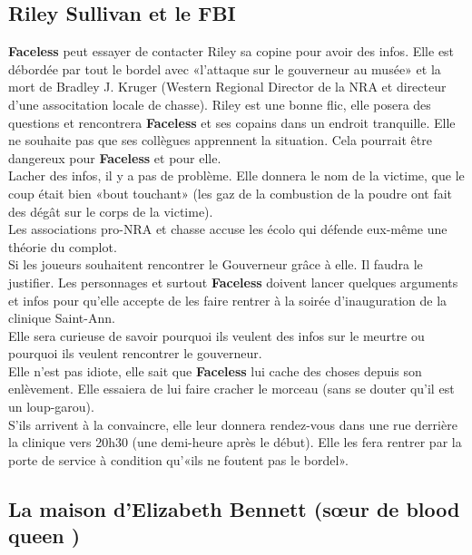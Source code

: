 \documentclass[oneside,12pt]{book}
\newcommand{\Laura}{\textbf{blood queen} }
\newcommand{\Andy}{\textbf{Faceless} }
\begin{document}
\begin{flushleft}
\subsection{Riley Sullivan et le FBI}
\Andy peut essayer de contacter Riley sa copine pour avoir des infos. Elle est débordée par tout le bordel avec «l’attaque sur le gouverneur au musée» et la mort de Bradley J. Kruger (Western Regional Director de la NRA et directeur d’une associtation locale de chasse). 
Riley est une bonne flic, elle posera des questions et rencontrera \Andy et ses copains dans un endroit tranquille. Elle ne souhaite pas que ses collègues apprennent la situation. Cela pourrait être dangereux pour \Andy et pour elle. \\
Lacher des infos, il y a pas de problème. Elle donnera le nom de la victime, que le coup était bien «bout touchant» (les gaz de la combustion de la poudre ont fait des dégât sur le corps de la victime).\\
Les associations pro-NRA et chasse accuse les écolo qui défende eux-même une théorie du complot.\\ 
Si les joueurs souhaitent rencontrer le Gouverneur grâce à elle. Il faudra le justifier. Les personnages et surtout \Andy doivent lancer quelques arguments et infos pour qu’elle accepte de les faire rentrer à la soirée d’inauguration de la clinique Saint-Ann. \\
Elle sera curieuse de savoir pourquoi ils veulent des infos sur le meurtre ou pourquoi ils veulent rencontrer le gouverneur. \\
Elle n’est pas idiote, elle sait que \Andy lui cache des choses depuis son enlèvement. Elle essaiera de lui faire cracher le morceau (sans se douter qu’il est un loup-garou).\\

S’ils arrivent à la convaincre, elle leur donnera rendez-vous dans une rue derrière la clinique vers 20h30 (une demi-heure après le début). Elle les fera rentrer par la porte de service à condition qu’«ils ne foutent pas le bordel».\\


\subsection{La maison d’Elizabeth Bennett (sœur de \Laura)}


\end{flushleft}
\end{document}
